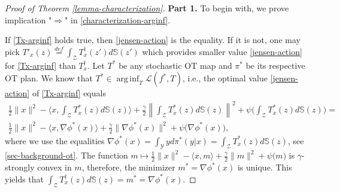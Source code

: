 \documentclass{article} %
\DeclareMathOperator*{\arginf}{arg\,inf}
\begin{document}
\begin{proof}[Proof of Theorem \ref{lemma-characterization}]
\textbf{Part 1.} To begin with, we prove implication "$\Longrightarrow$" in \eqref{characterization-arginf}.

If \eqref{Tx-arginf} holds true, then \eqref{jensen-action} is the equality. If it is not, one may pick ${T'_{x}(z)\stackrel{def}{=}\int_{\mathcal{Z}}T_{x}^{\dagger}(z')d\mathbb{S}(z')}$ which provides smaller value \eqref{jensen-action} for \eqref{Tx-arginf} than $T_{x}^{\dagger}$. Let $T^{*}$ be any stochastic OT map and $\pi^{*}$ be its respective OT plan. We know that $T^{*}\in\arginf_{T}\mathcal{L}(f^{*},T)$, i.e., the optimal value \eqref{jensen-action} of \eqref{Tx-arginf} equals
\begin{eqnarray}
    \frac{1}{2}\|x\|^{2}-\langle x,\int_{\mathcal{Z}}T_{x}^{*}(z)d\mathbb{S}(z)\rangle+\frac{\gamma}{2}\left\|\int_{\mathcal{Z}}T^{*}_{x}(z)d\mathbb{S}(z)\right\|^{2}+\psi\bigg(\int_{\mathcal{Z}}T^{*}_{x}(z)d\mathbb{S}(z)\bigg)=
    \label{opt-value-l}
    \\
    \frac{1}{2}\|x\|^{2}-\langle x,\nabla\phi^{*}(x)\rangle+\frac{\gamma}{2}\|\nabla\phi^{*}(x)\|^{2}+\psi\big(\nabla\phi^{*}(x)\big),
    \label{opt-value-l-phi}
\end{eqnarray}
where we use the equalities $\nabla\phi^{*}(x)=\int_{\mathcal{Y}}yd\pi^{*}(y|x)=\int_{\mathcal{Z}}T^{*}_{x}(z)d\mathbb{S}(z)$, see \wasyparagraph\ref{sec-background-ot}.
The function $m\mapsto \frac{1}{2}\|x\|^{2}-\langle x,m\rangle+\frac{\gamma}{2}\|m\|^{2}+\psi\big(m\big)$ is $\gamma$-strongly convex in $m$, therefore, the minimizer $m^{*}=\nabla\phi^{*}(x)$ is unique. This yields that $\int_{\mathcal{Z}}T^{\dagger}_{x}(z)d\mathbb{S}(z)=m^{*}=\nabla\phi^{*}(x)$.


\end{proof}
\end{document}
